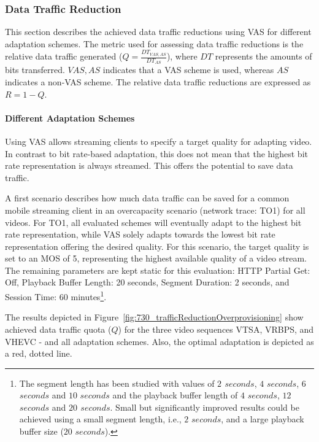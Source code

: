 \subsubsection{Data Traffic Reduction}
\label{sec:730_eval_network}
This section describes the achieved data traffic reductions using \ac{VAS} for different adaptation schemes.
The metric used for assessing data traffic reductions is the relative data traffic generated ($Q = \frac{DT_{VAS,AS}}{DT_{AS}}$), where $DT$ represents the amounts of bits transferred. $VAS,AS$ indicates that a \ac{VAS} scheme is used, whereas $AS$ indicates a non-\ac{VAS} scheme.
The relative data traffic reductions are expressed as $R = 1 - Q$.
\paragraph{Different Adaptation Schemes}
Using \ac{VAS} allows streaming clients to specify a target quality for adapting video.
In contrast to bit rate-based adaptation, this does not mean that the highest bit rate representation is always streamed.
This offers the potential to save data traffic.

A first scenario describes how much data traffic can be saved for a common mobile streaming client in an overcapacity scenario (network trace: TO1) for all videos.
For TO1, all evaluated schemes will eventually adapt to the highest bit rate representation, while \ac{VAS} solely adapts towards the lowest bit rate representation offering the desired quality.
For this scenario, the target quality is set to an \ac{MOS} of 5, representing the highest available quality of a video stream.
The remaining parameters are kept static for this evaluation: \ac{HTTP} Partial Get: Off, Playback Buffer Length: 20 seconds, Segment Duration: 2 seconds, and Session Time: 60 minutes\footnote{The segment length has been studied with values of \textbf{$2$  $\unit{seconds}$}, $4$ $\unit{seconds}$, $6$ $\unit{seconds}$ and $10$ $\unit{seconds}$ and the playback buffer length of $4$ $\unit{seconds}$, $12$ $\unit{seconds}$ and \textbf{$20$ $\unit{seconds}$}. Small but significantly improved results could be achieved using a small segment length, i.e., $2$ $\unit{seconds}$, and a large playback buffer size ($20$ $\unit{seconds}$).}.

The results depicted in Figure~\ref{fig:730_trafficReductionOverprovisioning} show achieved data traffic quota ($Q$) for the three video sequences VTSA, VRBPS, and VHEVC - and all adaptation schemes.
Also, the optimal adaptation is depicted as a red, dotted line.

